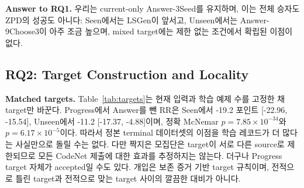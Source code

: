 \documentclass[10pt,conference]{IEEEtran}
\begin{document}
\noindent\textbf{Answer to RQ1.} 우리는 current-only Answer-3Seed를 유지하며, 이는 전체 승자도 ZPD의 성공도 아니다: Seen에서는 LSGen이 앞서고, Unseen에서는 Answer-9Choose3이 아주 조금 높으며, mixed target에는 제한 없는 조건에서 확립된 이점이 없다.

\subsection{RQ2: Target Construction and Locality}

\noindent\textbf{Matched targets.} Table~\ref{tab:targets}는 현재 입력과 학습 예제 수를 고정한 채 target만 바꾼다. Progress에서 Answer를 뺀 RR은 Seen에서 -19.2 포인트 [-22.96, -15.54], Unseen에서 -11.2 [-17.37, -4.88]이며, 정확 McNemar \(p=7.85\times10^{-34}\)와 \(p=6.17\times10^{-5}\)이다. 따라서 정본 terminal 데이터셋의 이점을 학습 레코드가 더 많다는 사실만으로 돌릴 수는 없다. 다만 짝지은 모집단은 target이 서로 다른 source로 제한되므로 모든 CodeNet 제출에 대한 효과를 추정하지는 않는다. 더구나 Progress target 자체가 accepted일 수도 있다. 개입은 보존 증거 기반 target 규칙이며, 전적으로 틀린 target과 전적으로 맞는 target 사이의 깔끔한 대비가 아니다.
\end{document}

